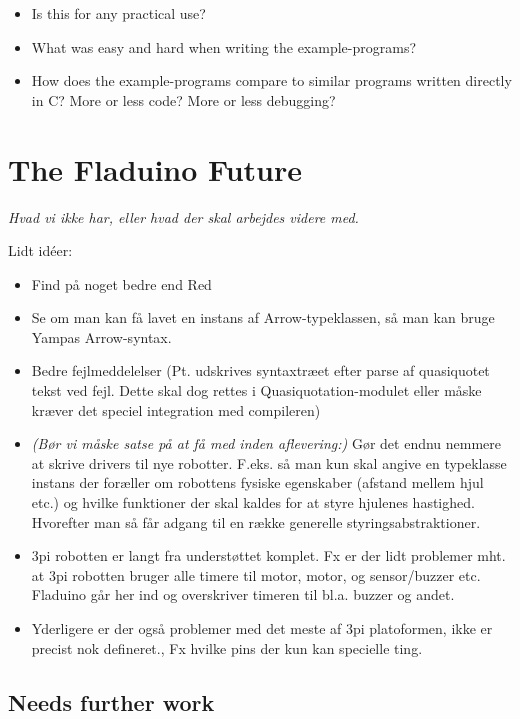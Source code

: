 \documentclass[a4paper, oneside, final]{memoir}
\begin{document}
\begin{itemize}
\item Is this for any practical use?
\item What was easy and hard when writing the example-programs?
\item How does the example-programs compare to similar programs
  written directly in C? More or less code? More or less debugging?
\end{itemize}

\chapter{The Fladuino Future}
\label{chap:futurework}
\textit{Hvad vi ikke har, eller hvad der skal arbejdes videre med. }

Lidt idéer:
\begin{itemize}
\item Find på noget bedre end Red 
\item Se om man kan få lavet en instans af Arrow-typeklassen, så man
  kan bruge Yampas Arrow-syntax.
\item Bedre fejlmeddelelser (Pt. udskrives syntaxtræet efter parse af
  quasiquotet tekst ved fejl. Dette skal dog rettes i
  Quasiquotation-modulet eller måske kræver det speciel integration
  med compileren)
\item \textit{(Bør vi måske satse på at få med inden aflevering:)}
  Gør det endnu nemmere at skrive drivers til nye
  robotter. F.eks. så man kun skal angive en typeklasse instans der
  foræller om robottens fysiske egenskaber (afstand mellem hjul etc.)
  og hvilke funktioner der skal kaldes for at styre hjulenes
  hastighed. Hvorefter man så får adgang til en række generelle
  styringsabstraktioner.

\item 3pi robotten er langt fra understøttet komplet. Fx er der lidt problemer
  mht. at 3pi robotten bruger alle timere til motor, motor, og sensor/buzzer
  etc. Fladuino går her ind og overskriver timeren til bl.a. buzzer og andet.

\item  Yderligere er der også problemer med det meste af 3pi platoformen, ikke
  er precist nok defineret., Fx hvilke pins der kun kan specielle ting.
\end{itemize}

\section{Needs further work}
\end{document}
